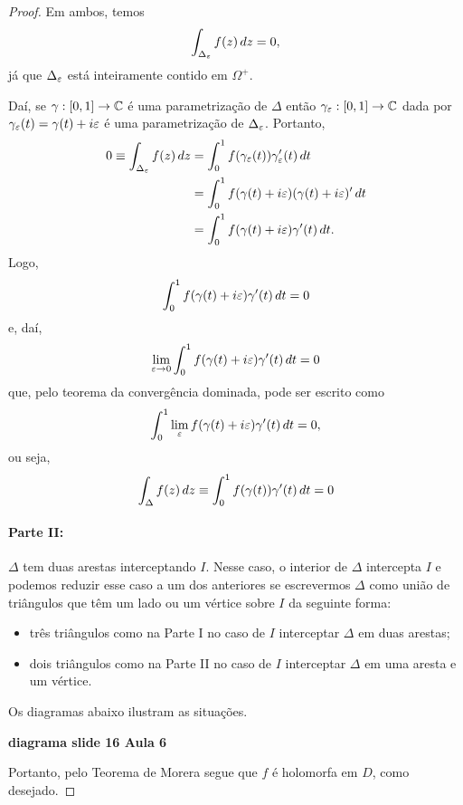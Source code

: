 \begin{proof}
        Em ambos, temos
        \begin{equation*}
            \int_{\Delta_{\varepsilon}} f(z)\, dz = 0,
        \end{equation*}
        já que $\Delta_{\varepsilon}$ está inteiramente contido em $\Omega^+$.
        
        Daí, se $\gamma:[0,1]\to\mathbb{C}$ é uma parametrização de $\Delta$ então
        $\gamma_{\varepsilon}:[0,1]\to\mathbb{C}$ dada por 
        $\gamma_{\varepsilon}(t) = \gamma(t) + i\varepsilon$ é uma parametrização de
        $\Delta_{\varepsilon}$. Portanto,
        \begin{align*}
            0 \equiv \int_{\Delta_{\varepsilon}} f(z)\, dz 
            &= \int_0^1 f(\gamma_{\varepsilon}(t))\gamma_{\varepsilon}'(t)\, dt \\
            &= \int_0^1 f(\gamma(t) + i\varepsilon)(\gamma(t) + i\varepsilon)'\, dt \\
            &= \int_0^1 f(\gamma(t) + i\varepsilon)\gamma'(t)\, dt.
        \end{align*}
        Logo, 
        \begin{equation*}
            \int_0^1 f(\gamma(t) + i\varepsilon)\gamma'(t)\, dt = 0
        \end{equation*}
        e, daí,
        \begin{align*}
            \lim_{\varepsilon\to 0} \int_0^1 f(\gamma(t) + i\varepsilon)\gamma'(t)\, dt = 0
        \end{align*}
        que, pelo teorema da convergência dominada, pode ser escrito como
        \begin{equation*}
            \int_0^1 \lim_{\varepsilon}f(\gamma(t) + i\varepsilon)\gamma'(t)\, dt = 0,
        \end{equation*}
        ou seja,
        \begin{equation*}
            \int_{\Delta} f(z)\, dz \equiv \int_0^1 f(\gamma(t))\gamma'(t)\, dt = 0
        \end{equation*}
        \paragraph{Parte II:} $\Delta$ tem duas arestas interceptando $I$. Nesse caso, o interior
        de $\Delta$ intercepta $I$ e podemos reduzir esse caso a um dos anteriores se escrevermos 
        $\Delta$ como união de triângulos que têm um lado ou um vértice sobre $I$ da seguinte forma:
        \begin{itemize}
            \item três triângulos como na Parte I no caso de $I$ interceptar $\Delta$
            em duas arestas;
            \item dois triângulos como na Parte II no caso de $I$ interceptar $\Delta$
            em uma aresta e um vértice.
        \end{itemize}
        Os diagramas abaixo ilustram as situações.
        \begin{center}
            {\bf diagrama slide 16 Aula 6}
        \end{center}
        Portanto, pelo Teorema de Morera segue que $f$ é holomorfa em $D$, como desejado.
    \end{proof}
    
